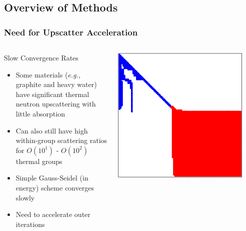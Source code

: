 \documentclass[compress,10pt]{beamer}
\begin{document}
\subsection{Overview of Methods}
\begin{frame}[t]\frametitle{Need for Upscatter Acceleration}
\begin{columns}
\begin{block}{Slow Convergence Rates}
\begin{itemize}
\item Some materials ({\em e.g.,} graphite and heavy water) have significant thermal neutron upscattering with little absorption
\item Can also still have high within-group scattering ratios for $O(10^1)$ - $O(10^2)$ thermal groups
\item Simple Gauss-Seidel (in energy) scheme converges slowly
\item Need to accelerate outer iterations
\end{itemize}
\end{block}
\centering
\includegraphics[width=0.9\textwidth]{images/Sparsity_Graphite.eps} \\

\end{columns}
\end{frame}
\end{document}
